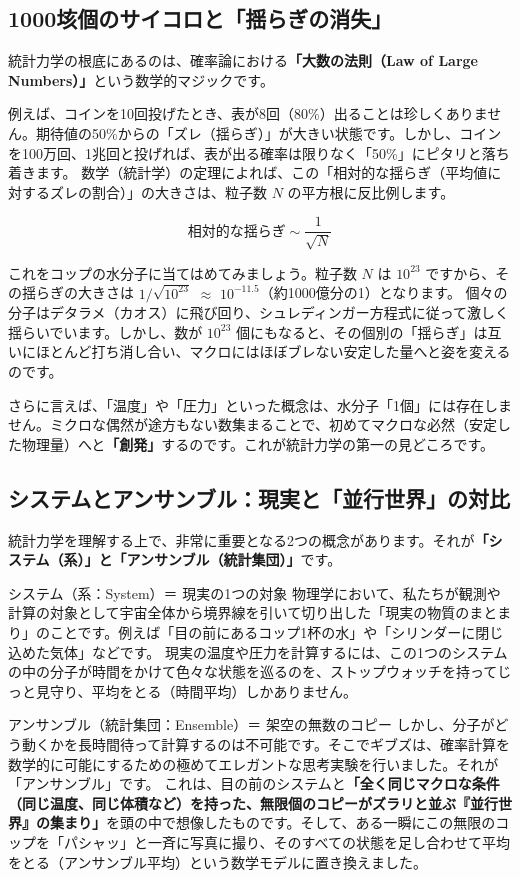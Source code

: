 \subsection{1000垓個のサイコロと「揺らぎの消失」}

統計力学の根底にあるのは、確率論における\textbf{「大数の法則（Law of Large Numbers）」}という数学的マジックです。

例えば、コインを10回投げたとき、表が8回（80\%）出ることは珍しくありません。期待値の50\%からの「ズレ（揺らぎ）」が大きい状態です。しかし、コインを100万回、1兆回と投げれば、表が出る確率は限りなく「50\%」にピタリと落ち着きます。 数学（統計学）の定理によれば、この「相対的な揺らぎ（平均値に対するズレの割合）」の大きさは、粒子数 \(N\) の平方根に反比例します。

\[
\text{相対的な揺らぎ} \sim \frac{1}{\sqrt{N}}
\]

これをコップの水分子に当てはめてみましょう。粒子数 \(N\) は \ensuremath{10^{23}} ですから、その揺らぎの大きさは \ensuremath{1/\sqrt{10^{23}}} \ensuremath{\approx} \ensuremath{10^{-11.5}}（約1000億分の1）となります。 個々の分子はデタラメ（カオス）に飛び回り、シュレディンガー方程式に従って激しく揺らいでいます。しかし、数が \ensuremath{10^{23}} 個にもなると、その個別の「揺らぎ」は互いにほとんど打ち消し合い、マクロにはほぼブレない安定した量へと姿を変えるのです。

さらに言えば、「温度」や「圧力」といった概念は、水分子「1個」には存在しません。ミクロな偶然が途方もない数集まることで、初めてマクロな必然（安定した物理量）へと\textbf{「創発」}するのです。これが統計力学の第一の見どころです。

\subsection{システムとアンサンブル：現実と「並行世界」の対比}

統計力学を理解する上で、非常に重要となる2つの概念があります。それが\textbf{「システム（系）」と「アンサンブル（統計集団）」}です。

システム（系：System）＝ 現実の1つの対象 物理学において、私たちが観測や計算の対象として宇宙全体から境界線を引いて切り出した「現実の物質のまとまり」のことです。例えば「目の前にあるコップ1杯の水」や「シリンダーに閉じ込めた気体」などです。 現実の温度や圧力を計算するには、この1つのシステムの中の分子が時間をかけて色々な状態を巡るのを、ストップウォッチを持ってじっと見守り、平均をとる（時間平均）しかありません。

アンサンブル（統計集団：Ensemble）＝ 架空の無数のコピー しかし、分子がどう動くかを長時間待って計算するのは不可能です。そこでギブズは、確率計算を数学的に可能にするための極めてエレガントな思考実験を行いました。それが「アンサンブル」です。 これは、目の前のシステムと\textbf{「全く同じマクロな条件（同じ温度、同じ体積など）を持った、無限個のコピーがズラリと並ぶ『並行世界』の集まり」}を頭の中で想像したものです。そして、ある一瞬にこの無限のコップを「パシャッ」と一斉に写真に撮り、そのすべての状態を足し合わせて平均をとる（アンサンブル平均）という数学モデルに置き換えました。

